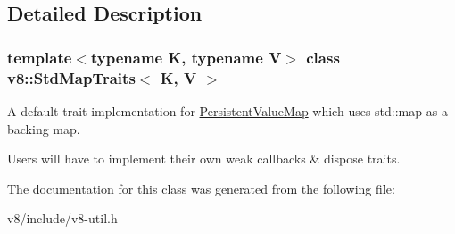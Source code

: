 \subsection{Detailed Description}
\subsubsection*{template$<$typename K, typename V$>$\newline
class v8\+::\+Std\+Map\+Traits$<$ K, V $>$}

A default trait implementation for \mbox{\hyperlink{classv8_1_1PersistentValueMap}{Persistent\+Value\+Map}} which uses std\+::map as a backing map.

Users will have to implement their own weak callbacks \& dispose traits. 

The documentation for this class was generated from the following file\+:\begin{DoxyCompactItemize}
\item 
v8/include/v8-\/util.\+h\end{DoxyCompactItemize}
